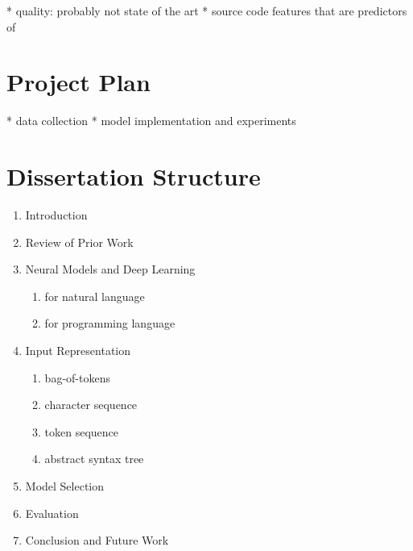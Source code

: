 \documentclass[twoside,a4paper]{scrartcl}
\begin{document}
* quality: probably not state of the art
* source code features that are predictors of 

\section{Project Plan}

* data collection
* model implementation and experiments

\section{Dissertation Structure}

\begin{enumerate}
\item Introduction
\item Review of Prior Work
\item Neural Models and Deep Learning
    \begin{enumerate}
    \item for natural language
    \item for programming language
    \end{enumerate}
\item Input Representation
    \begin{enumerate}
    \item bag-of-tokens
    \item character sequence
    \item token sequence
    \item abstract syntax tree
    \end{enumerate}
\item Model Selection
\item Evaluation
\item Conclusion and Future Work
\end{enumerate}



\end{document}
